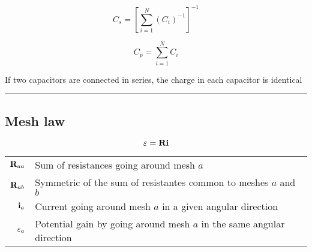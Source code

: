 \documentclass{form}
\begin{document}
\begin{center}
	\begin{minipage}[c]{0.17\textwidth}
		\begin{equation*}
			C_s = \left[\sum_{i=1}^{N}{(C_i)^{-1}}\right]^{-1}
		\end{equation*}
	\end{minipage}
	\begin{minipage}[c]{0.11\textwidth}
		\begin{equation*}
			C_p = \sum_{i=1}^{N}{C_i}
		\end{equation*}
	\end{minipage}
	\begin{minipage}[c]{0.70\textwidth}
		If two capacitors are connected in series, the charge in each capacitor is identical
	\end{minipage}
\end{center}
\noindent\rule{\textwidth}{0.4pt}
\begin{minipage}[c]{0.15\textwidth}
	\subsection*{Mesh law}
\end{minipage}
\begin{minipage}[c]{0.15\textwidth}
	\begin{equation*}
		\mathbf{\varepsilon}=\mathbf{R}\mathbf{i}
	\end{equation*}
\end{minipage}
\begin{minipage}[c]{0.65\textwidth}
	\begin{tabular}{ r l }
		$\mathbf{R}_{aa}$ & Sum of resistances going around mesh $a$ \\
		$\mathbf{R}_{ab}$ & Symmetric of the sum of resistantes common to meshes $a$ and $b$\\
		$\mathbf{i}_a   $ & Current going around mesh $a$ in a given angular direction\\
		$\mathbf{\varepsilon}_a$ & Potential gain by going around mesh $a$ in the same angular direction
	\end{tabular}
\end{minipage}\\
\end{document}
